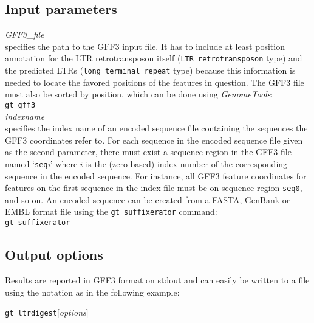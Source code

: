 \documentclass[12pt,titlepage]{article}
\newcommand{\GenomeTools}{\textit{GenomeTools}\xspace}
\newcommand{\GtLTRdigest}{\texttt{gt ltrdigest}\xspace}
\newcommand{\Gtsuffixerator}{\texttt{gt suffixerator}\xspace}
\begin{document}
\newpage
\subsection{Input parameters}

\emph{GFF3\_file}\\ specifies the path to the GFF3 input file. It has to include at least position annotation for the LTR retrotransposon itself (\texttt{LTR\_retrotransposon} type) and the predicted LTRs (\texttt{long\_terminal\_repeat} type) because this information is needed to locate the favored positions of the features in question. The GFF3 file must also be sorted by position, which can be done using \GenomeTools :\\
\texttt{gt gff3}   \texttt{} \\

\emph{indexname}\\ specifies the index name of an encoded sequence file containing the sequences the GFF3 coordinates refer to. For each sequence in the encoded sequence file given as the second parameter, there must exist a sequence region in the GFF3 file named `\texttt{seq}\textit{i}' where $i$ is the (zero-based) index number of the corresponding sequence in the encoded sequence. For instance, all GFF3 feature coordinates for features on the first sequence in the index file must be on sequence region \texttt{seq0}, and so on. An encoded sequence can be created from a FASTA, GenBank or EMBL format file using the \Gtsuffixerator command:\\
\Gtsuffixerator {}       

\subsection{Output options}

Results are reported in GFF3 format on stdout and can easily
be written to a file using the notation \texttt{}
 as in the following example:

\GtLTRdigest $[$\emph{options}$]$   \texttt{} 
\end{document}
